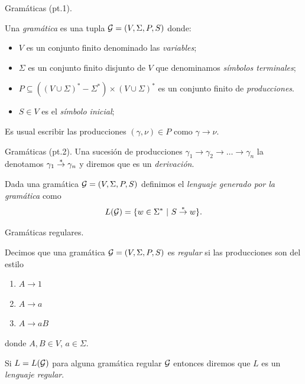 \documentclass[aspectratio=169, 11pt]{beamer}
\begin{document}
	\begin{frame}[fragile]{Gramáticas (pt.1).}
		\begin{deff}
			Una \emph{gramática} es una tupla ${\cal G} = (V, \Sigma, P, S)$ donde:
				\begin{itemize}
					\item $V$ es un conjunto finito denominado las \emph{variables};
					\item $\Sigma$ es un conjunto finito disjunto de $V$ que denominamos \emph{símbolos terminales};
					\item $P \subseteq ((V \cup \Sigma)^{*} - \Sigma^{*}) \times (V \cup \Sigma)^*$ es un conjunto finito de \emph{producciones}.
					
					\item $S \in V$ es el \emph{símbolo inicial};
				\end{itemize}
				Es usual escribir las producciones $(\gamma, \nu) \in P$ como $\gamma \to \nu$. 
		\end{deff}
	\end{frame}
	
	\begin{frame}[fragile]{Gramáticas (pt.2).}
		Una sucesión de producciones $\gamma_{1} \to \gamma_{2} \to \dots \to \gamma_{n}$ la denotamos $\gamma_{1} \overset{*}{\to} \gamma_{n}$ y diremos que es un \emph{derivación}.



		\begin{deff}
			Dada una gramática ${\cal G} = (V, \Sigma, P, S)$  definimos el \emph{lenguaje generado por la gramática} como
			\[
			L({\cal G}) = \{ w \in \Sigma^* \ | \ S \overset{*}{\to} w   \}.
			\]
		\end{deff}		
	\end{frame}

	\begin{frame}{Gramáticas regulares.}
		\begin{deff}
			Decimos que una gramática ${\cal G} = (V, \Sigma, P, S)$ es \emph{regular} si las producciones son del estilo
	\begin{enumerate}
		\item $A \to 1$
		\item $A \to a$
		\item $A \to a B$
	\end{enumerate}
	donde $A, B \in V$, $a \in \Sigma$.

	Si $L=L({\cal G})$ para alguna gramática regular $\cal G$ entonces diremos que $L$ es un \emph{lenguaje regular}.
		\end{deff}
	\end{frame}
\end{document}

